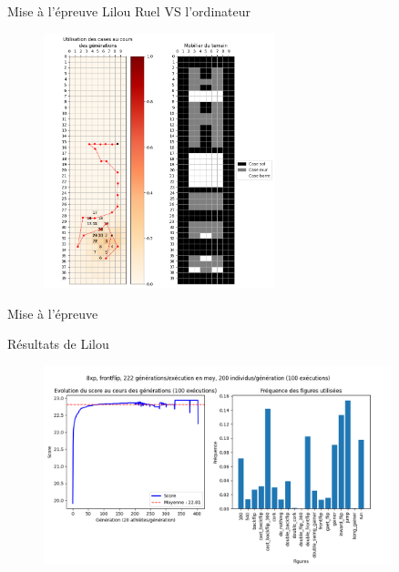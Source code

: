 \documentclass[aspectratio=43, usepdftitle=false, xcolor={dvipsnames}]{beamer}
\begin{document}
\begin{frame}{Mise à l'épreuve}
	Lilou Ruel VS l'ordinateur
	
	\begin{figure}
		\center
		\includegraphics[width=0.6\textwidth]{images/LILOUcases.png} 
	\end{figure}
\end{frame}

\begin{frame}{Mise à l'épreuve}
	
	\begin{block}{Résultats de Lilou}
	\end{block}

	\begin{figure}
		\center
		\includegraphics[width=0.9\textwidth]{images/LILOUfreq&fitness.png} 
	\end{figure}
\end{frame}
\end{document}
